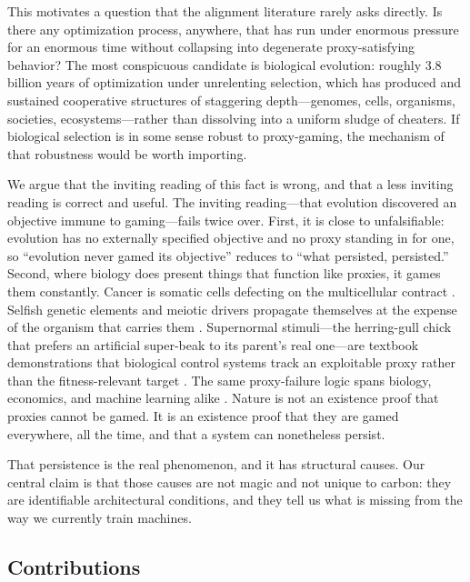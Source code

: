 \documentclass[11pt]{article}
\begin{document}
This motivates a question that the alignment literature rarely asks directly. Is there any optimization process, anywhere, that has run under enormous pressure for an enormous time without collapsing into degenerate proxy-satisfying behavior? The most conspicuous candidate is biological evolution: roughly 3.8 billion years of optimization under unrelenting selection, which has produced and sustained cooperative structures of staggering depth---genomes, cells, organisms, societies, ecosystems---rather than dissolving into a uniform sludge of cheaters. If biological selection is in some sense robust to proxy-gaming, the mechanism of that robustness would be worth importing.

We argue that the inviting reading of this fact is wrong, and that a less inviting reading is correct and useful. The inviting reading---that evolution discovered an objective immune to gaming---fails twice over. First, it is close to unfalsifiable: evolution has no externally specified objective and no proxy standing in for one, so ``evolution never gamed its objective'' reduces to ``what persisted, persisted.'' Second, where biology does present things that function like proxies, it games them constantly. Cancer is somatic cells defecting on the multicellular contract \citep{aktipis2020,hanahan2000}. Selfish genetic elements and meiotic drivers propagate themselves at the expense of the organism that carries them \citep{burt2006}. Supernormal stimuli---the herring-gull chick that prefers an artificial super-beak to its parent's real one---are textbook demonstrations that biological control systems track an exploitable proxy rather than the fitness-relevant target \citep{tinbergen1951}. The same proxy-failure logic spans biology, economics, and machine learning alike \citep{john2023}. Nature is not an existence proof that proxies cannot be gamed. It is an existence proof that they are gamed everywhere, all the time, and that a system can nonetheless persist.

That persistence is the real phenomenon, and it has structural causes. Our central claim is that those causes are not magic and not unique to carbon: they are identifiable architectural conditions, and they tell us what is missing from the way we currently train machines.

\subsection*{Contributions}
\end{document}

